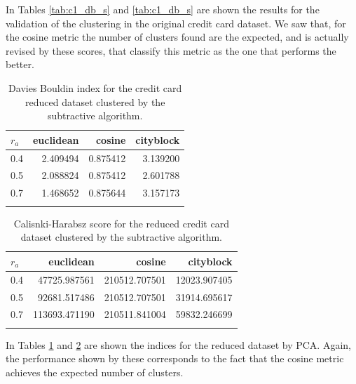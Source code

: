 \documentclass[conference]{IEEEtran}
\begin{document}
\begin{itemize}
    In Tables \ref{tab:c1_db_s} and \ref{tab:c1_db_s} are shown the results for the validation of the clustering in the original credit card dataset. We saw that, for the cosine metric the number of clusters found are the expected, and is actually revised by these scores, that classify this metric as the one that performs the better. \\
    
    \begin{table}[ht!]
        \centering
        \begin{tabular}{lrrr}
        \toprule
        $r_a$ &  euclidean &    cosine &  cityblock \\
        \midrule
        0.4 &   2.409494 &  0.875412 &   3.139200 \\
        0.5 &   2.088824 &  0.875412 &   2.601788 \\
        0.7 &   1.468652 &  0.875644 &   3.157173 \\
        \bottomrule \\
        \end{tabular}
        \caption{Davies Bouldin index for the credit card reduced dataset clustered by the subtractive algorithm.}
        \label{tab:c2_db_s}
    \end{table}
    
    \begin{table}[ht!]
        \centering
        \begin{tabular}{lrrr}
        \toprule
        $r_a$ &      euclidean &         cosine &     cityblock \\
        \midrule
        0.4 &   47725.987561 &  210512.707501 &  12023.907405 \\
        0.5 &   92681.517486 &  210512.707501 &  31914.695617 \\
        0.7 &  113693.471190 &  210511.841004 &  59832.246699 \\
        \bottomrule \\
        \end{tabular}
        \caption{Calisnki-Harabsz score for the reduced credit card dataset clustered by the subtractive algorithm.}
        \label{tab:c2_ch_s}
    \end{table}
    
    In Tables \ref{tab:c2_db_s} and \ref{tab:c2_ch_s} are shown the indices for the reduced dataset by PCA. Again, the performance shown by these corresponds to the fact that the cosine metric achieves the expected number of clusters.
    

\end{itemize}
\end{document}
